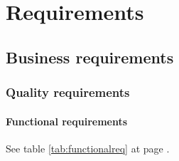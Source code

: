 

\chapter{Requirements}

\section{Business requirements}

\subsection{Quality requirements}

\subsubsection{Functional requirements}
See table \ref{tab:functionalreq} at page \pageref{tab:functionalreq}.

